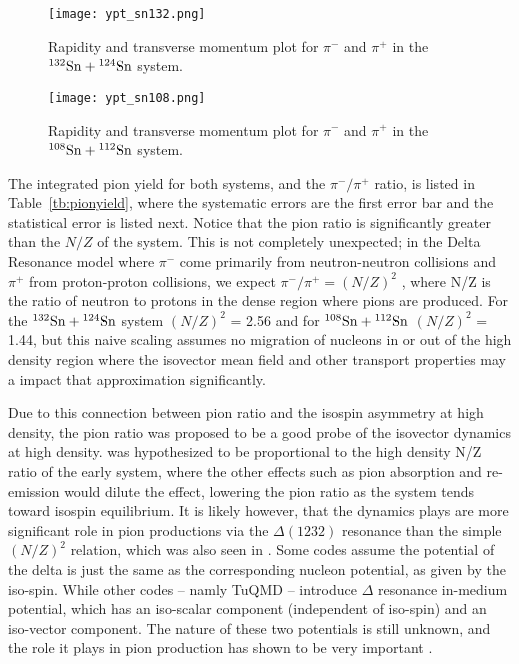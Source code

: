 \begin{figure}[!htb]
\centering
\texttt{[image: ypt\_sn132.png]}
\caption{Rapidity and transverse momentum plot for $\pi^-$ and $\pi^+$ in the ${}^{132}\mathrm{Sn} + {}^{124}\mathrm{Sn}$ system.}
\label{fig:ptrap_sn132}
\end{figure}


\begin{figure}[!htb]
\centering
\texttt{[image: ypt\_sn108.png]}
\caption{Rapidity and transverse momentum plot for $\pi^-$ and $\pi^+$ in the ${}^{108}\mathrm{Sn} + {}^{112}\mathrm{Sn}$ system.}
\label{fig:ptrap_sn132}
\end{figure}

The integrated pion yield for both systems, and the $\pi^-/\pi^+$ ratio, is listed in Table~\ref{tb:pionyield}, where the systematic errors are the first error bar and the statistical error is listed next. Notice that the pion ratio is significantly greater than the $N/Z$ of the system.  This is not completely unexpected; in the Delta Resonance model where $\pi^-$ come primarily from neutron-neutron collisions and $\pi^+$ from proton-proton collisions, we expect  $\pi^-/\pi^+ = (N/Z)^2$ \cite{baoan_piprod1,baoan_piprod2}, where N/Z is the ratio of neutron to protons in the dense region where pions are produced. For the ${}^{132}\mathrm{Sn} + {}^{124}\mathrm{Sn}$ system $(N/Z)^2$ = 2.56 and for ${}^{108}\mathrm{Sn} + {}^{112}\mathrm{Sn}$ $(N/Z)^2$ = 1.44, but this naive scaling assumes no migration of nucleons in or out of the high density region where the isovector mean field and other transport properties may a impact that approximation significantly. 


Due to this connection between pion ratio and the isospin asymmetry at high density, the pion ratio was proposed to be a good probe of the isovector dynamics at high density. was hypothesized to be proportional to the high density N/Z ratio of the early system, where the other effects such as pion absorption and re-emission would dilute the effect, lowering the pion ratio as the system tends toward isospin equilibrium. It is likely however, that the dynamics plays are more significant role in pion productions via the $\Delta(1232)$ resonance than the simple $(N/Z)^2$ relation, which was also seen in \cite{fopi}. Some codes assume the potential of the delta is just the same as the corresponding nucleon potential, as given by the iso-spin. While other codes -- namly TuQMD -- introduce $\Delta$ resonance in-medium potential, which has an iso-scalar component (independent of iso-spin) and an iso-vector component.  The nature of these two potentials is still unknown, and the role it plays in pion production has shown to be very important \cite{baoan_deltapotential, cozmaPC}.


